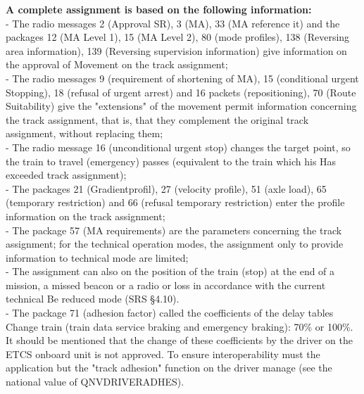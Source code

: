 \documentclass{template/openetcs_report}
\begin{document}
\textbf{A complete assignment is based on the following information:} \\

- The radio messages 2 (Approval SR), 3 (​​MA), 33 (MA reference it) and the packages 12 
(MA Level 1), 15 (MA Level 2), 80 (mode profiles), 138 (Reversing area information), 139 
(Reversing supervision information) give information on the approval of 
Movement on the track assignment; \\

- The radio messages 9 (requirement of shortening of MA), 15 (conditional urgent 
Stopping), 18 (refusal of urgent arrest) and 16 packets (repositioning), 
70 (Route Suitability) give the "extensions" of the movement permit information 
concerning the track assignment, that is, that they complement the original track assignment, 
without replacing them; \\

- The radio message 16 (unconditional urgent stop) changes the target point, so 
the train to travel (emergency) passes (equivalent to the train which his 
Has exceeded track assignment); \\

- The packages 21 (Gradientprofil), 27 (velocity profile), 51 (axle load), 65 
(temporary restriction) and 66 (refusal temporary restriction) 
enter the profile information on the track assignment; \\

- The package 57 (MA requirements) are the parameters concerning the track assignment; 
for the technical operation modes, the assignment only to provide information to 
technical mode are limited; \\

- The assignment can also on the position of the train (stop) at the end of a mission, 
a missed beacon or a radio or loss in accordance with the current technical 
Be reduced mode (SRS §4.10). \\

- The package 71 (adhesion factor) called the coefficients of the delay tables 
      Change train (train data service braking and emergency braking): 70\% or 100\%. 
      It should be mentioned that the change of these coefficients by the driver on the 
      ETCS onboard unit is not approved. To ensure interoperability must 
      the application but the "track adhesion" function on the driver 
      manage (see the national value of QNVDRIVERADHES). \\
      
\end{document}

